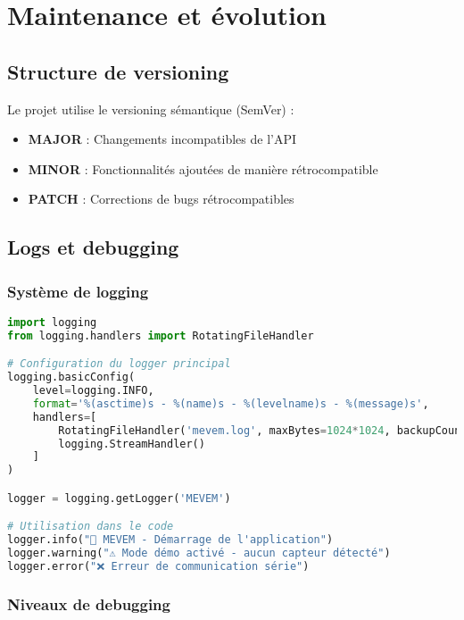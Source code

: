 \documentclass[12pt,a4paper]{article}
\begin{document}
\section{Maintenance et évolution}

\subsection{Structure de versioning}

Le projet utilise le versioning sémantique (SemVer) :
\begin{itemize}
    \item \textbf{MAJOR} : Changements incompatibles de l'API
    \item \textbf{MINOR} : Fonctionnalités ajoutées de manière rétrocompatible
    \item \textbf{PATCH} : Corrections de bugs rétrocompatibles
\end{itemize}

\subsection{Logs et debugging}

\subsubsection{Système de logging}

\begin{lstlisting}[language=python, caption=Configuration du logging]
import logging
from logging.handlers import RotatingFileHandler

# Configuration du logger principal
logging.basicConfig(
    level=logging.INFO,
    format='%(asctime)s - %(name)s - %(levelname)s - %(message)s',
    handlers=[
        RotatingFileHandler('mevem.log', maxBytes=1024*1024, backupCount=5),
        logging.StreamHandler()
    ]
)

logger = logging.getLogger('MEVEM')

# Utilisation dans le code
logger.info("🌽 MEVEM - Démarrage de l'application")
logger.warning("⚠️ Mode démo activé - aucun capteur détecté")
logger.error("❌ Erreur de communication série")
\end{lstlisting}

\subsubsection{Niveaux de debugging}
\end{document}
